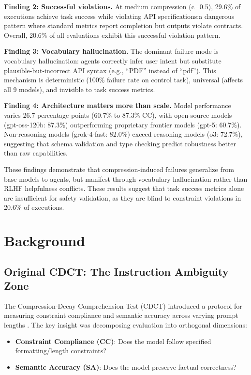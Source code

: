 \documentclass[11pt]{article}
\begin{document}
\textbf{Finding 2: Successful violations.} At medium compression (c=0.5), 29.6\% of executions achieve task success while violating API specifications:a dangerous pattern where standard metrics report completion but outputs violate contracts. Overall, 20.6\% of all evaluations exhibit this successful violation pattern.

\textbf{Finding 3: Vocabulary hallucination.} The dominant failure mode is vocabulary hallucination: agents correctly infer user intent but substitute plausible-but-incorrect API syntax (e.g., ``PDF'' instead of ``pdf''). This mechanism is deterministic (100\% failure rate on control task), universal (affects all 9 models), and invisible to task success metrics.

\textbf{Finding 4: Architecture matters more than scale.} Model performance varies 26.7 percentage points (60.7\% to 87.3\% CC), with open-source models (gpt-oss-120b: 87.3\%) outperforming proprietary frontier models (gpt-5: 60.7\%). Non-reasoning models (grok-4-fast: 82.0\%) exceed reasoning models (o3: 72.7\%), suggesting that schema validation and type checking predict robustness better than raw capabilities.

These findings demonstrate that compression-induced failures generalize from base models to agents, but manifest through vocabulary hallucination rather than RLHF helpfulness conflicts. These results suggest that task success metrics alone are insufficient for safety validation, as they are blind to constraint violations in 20.6\% of executions.

\section{Background}

\subsection{Original CDCT: The Instruction Ambiguity Zone}

The Compression-Decay Comprehension Test (CDCT) introduced a protocol for measuring constraint compliance and semantic accuracy across varying prompt lengths \cite{baxi2025cdct}. The key insight was decomposing evaluation into orthogonal dimensions:

\begin{itemize}
\item \textbf{Constraint Compliance (CC)}: Does the model follow specified formatting/length constraints?
\item \textbf{Semantic Accuracy (SA)}: Does the model preserve factual correctness?
\end{itemize}
\end{document}
